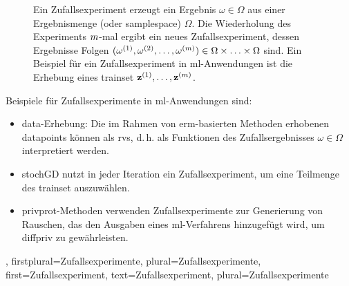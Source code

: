 {{\begin{figure}[h]
\begin{center}
\begin{tikzpicture}[>=Stealth, node distance=1.5cm and 2cm, every node/.style={font=\small}]
	 \end{tikzpicture}
	\end{center}
	\caption{Ein Zufallsexperiment erzeugt ein Ergebnis $\omega \in \Omega$ aus einer Ergebnismenge (oder \gls{samplespace}) $\Omega$. Die Wiederholung des Experiments $\samplesize$-mal ergibt ein neues Zufallsexperiment, dessen Ergebnisse Folgen $(\omega^{(1)}, \omega^{(2)}, \dots, \omega^{(\samplesize)}) \in \Omega\times\ldots\times \Omega$ sind. Ein Beispiel für ein Zufallsexperiment in \gls{ml}-Anwendungen ist die Erhebung eines \gls{trainset} $\datapoint^{(1)},\ldots,\datapoint^{(\samplesize)}$.}
  \end{figure}
  Beispiele für Zufallsexperimente in \gls{ml}-Anwendungen sind:
  \begin{itemize}
  	\item \Gls{data}-Erhebung: Die im Rahmen von \gls{erm}-basierten Methoden erhobenen \glspl{datapoint} können als \glspl{rv}, d.\,h. als Funktionen des Zufallsergebnisses $\omega \in \Omega$ interpretiert werden.
  	\item \Gls{stochGD} nutzt in jeder Iteration ein Zufallsexperiment, um eine Teilmenge des \gls{trainset} auszuwählen.
  	\item \Gls{privprot}-Methoden verwenden Zufallsexperimente zur Generierung von Rauschen, das den Ausgaben eines \gls{ml}-Verfahrens hinzugefügt wird, um \gls{diffpriv} zu gewährleisten.
  \end{itemize}},
firstplural={Zufallsexperimente},
plural={Zufallsexperimente},
first={Zufallsexperiment},
text={Zufallsexperiment}, 
plural={Zufallsexperimente}
}


